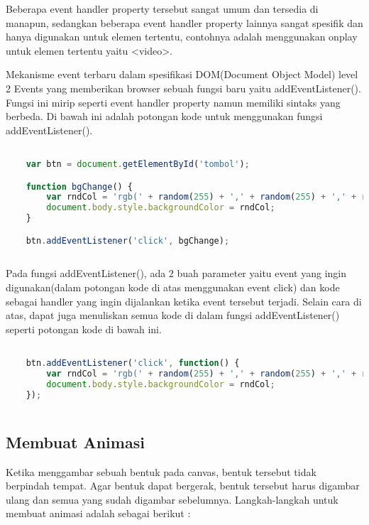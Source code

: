 Beberapa event handler property tersebut sangat umum dan tersedia di manapun, sedangkan beberapa event handler property lainnya sangat spesifik dan hanya digunakan untuk elemen tertentu, contohnya adalah menggunakan onplay untuk elemen tertentu yaitu <video>.

Mekanisme event terbaru dalam spesifikasi DOM(Document Object Model) level 2 Events yang memberikan browser sebuah fungsi baru yaitu addEventListener(). Fungsi ini mirip seperti event handler property namun memiliki sintaks yang berbeda. Di bawah ini adalah potongan kode untuk menggunakan fungsi addEventListener().

\begin{lstlisting}[language=Javascript, caption=Menggunakan fungsi addEventListener()]

	var btn = document.getElementById('tombol');

	function bgChange() {
  		var rndCol = 'rgb(' + random(255) + ',' + random(255) + ',' + random(255) + ')';
  		document.body.style.backgroundColor = rndCol;
	}   

	btn.addEventListener('click', bgChange);
	
\end{lstlisting}

Pada fungsi addEventListener(), ada 2 buah parameter yaitu event yang ingin digunakan(dalam potongan kode di atas menggunakan event click) dan kode sebagai handler yang ingin dijalankan ketika event tersebut terjadi. Selain cara di atas, dapat juga menuliskan semua kode di dalam fungsi addEventListener() seperti potongan kode di bawah ini.

\begin{lstlisting}[language=Javascript, caption=Menuliskan kode di dalam fungsi addEventListener()]

	btn.addEventListener('click', function() {
  		var rndCol = 'rgb(' + random(255) + ',' + random(255) + ',' + random(255) + ')';
  		document.body.style.backgroundColor = rndCol;
	});
	
\end{lstlisting}


\subsection{Membuat Animasi}
Ketika menggambar sebuah bentuk pada canvas, bentuk tersebut tidak berpindah tempat. Agar bentuk dapat bergerak, bentuk tersebut harus digambar ulang dan semua yang sudah digambar sebelumnya. Langkah-langkah untuk membuat animasi adalah sebagai berikut :

